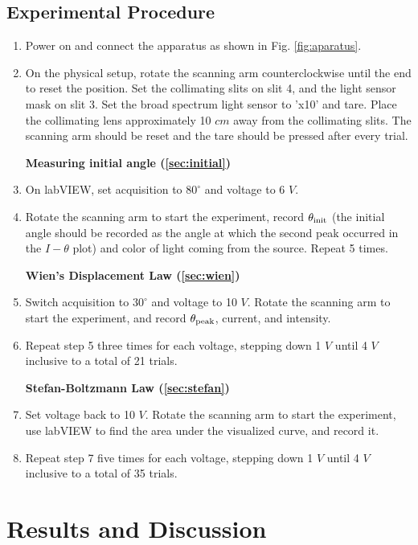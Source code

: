 \documentclass[12pt]{article}
\begin{document}
\subsection{Experimental Procedure}
\begin{enumerate}
    \item Power on and connect the apparatus as shown in Fig. \ref{fig:aparatus}.
    \item On the physical setup, rotate the scanning arm counterclockwise until the end to reset the position. Set the collimating slits on slit 4, and the light sensor mask on slit 3. Set the broad spectrum light sensor to 'x10' and tare. Place the collimating lens approximately 10 $cm$ away from the collimating slits. The scanning arm should be reset and the tare should be pressed after every trial.
    
    \textbf{Measuring initial angle (\ref{sec:initial})}
    \vspace{-10pt}
    \item On labVIEW, set acquisition to $80^\circ$ and voltage to 6 $V$.
    \item Rotate the scanning arm to start the experiment, record $\theta_{\rm init}$ (the initial angle should be recorded as the angle at which the second peak occurred in the $I-\theta$ plot) and color of light coming from the source. Repeat 5 times.

    \textbf{Wien's Displacement Law (\ref{sec:wien})}
    \vspace{-10pt}
    \item Switch acquisition to $30^\circ$ and voltage to 10 $V$. Rotate the scanning arm to start the experiment, and record $\theta_{\rm peak}$, current, and intensity.
    \item Repeat step 5 three times for each voltage, stepping down 1 $V$ until 4 $V$ inclusive to a total of 21 trials.

    \textbf{Stefan-Boltzmann Law (\ref{sec:stefan})}
    \vspace{-10pt}
    \item Set voltage back to 10 $V$.  Rotate the scanning arm to start the experiment, use labVIEW to find the area under the visualized curve, and record it.
    \item Repeat step 7 five times for each voltage, stepping down 1 $V$ until 4 $V$ inclusive to a total of 35 trials.
\end{enumerate}

\section{Results and Discussion}
\end{document}
